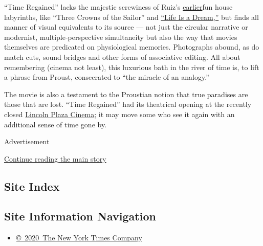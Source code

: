 ``Time Regained'' lacks the majestic screwiness of Ruiz's
\href{https://www.nytimes3xbfgragh.onion/2016/11/30/movies/the-films-of-raul-ruiz-come-to-lincoln-center.html}{earlier}fun
house labyrinths, like ``Three Crowns of the Sailor'' and
\href{http://www.nytimes3xbfgragh.onion/1988/12/30/movies/chilean-s-life-is-a-dream.html}{``Life
Is a Dream,''} but finds all manner of visual equivalents to its source
--- not just the circular narrative or modernist, multiple-perspective
simultaneity but also the way that movies themselves are predicated on
physiological memories. Photographs abound, as do match cuts, sound
bridges and other forms of associative editing. All about remembering
(cinema not least), this luxurious bath in the river of time is, to lift
a phrase from Proust, consecrated to ``the miracle of an analogy.''

The movie is also a testament to the Proustian notion that true
paradises are those that are lost. ``Time Regained'' had its theatrical
opening at the recently closed
\href{https://www.nytimes3xbfgragh.onion/2017/12/16/nyregion/lincoln-plaza-cinema-close.html}{Lincoln
Plaza Cinema}; it may move some who see it again with an additional
sense of time gone by.

Advertisement

\protect\hyperlink{after-bottom}{Continue reading the main story}

\hypertarget{site-index}{%
\subsection{Site Index}\label{site-index}}

\hypertarget{site-information-navigation}{%
\subsection{Site Information
Navigation}\label{site-information-navigation}}

\begin{itemize}
\tightlist
\item
  \href{https://help.nytimes3xbfgragh.onion/hc/en-us/articles/115014792127-Copyright-notice}{©~2020~The
  New York Times Company}
\end{itemize}

